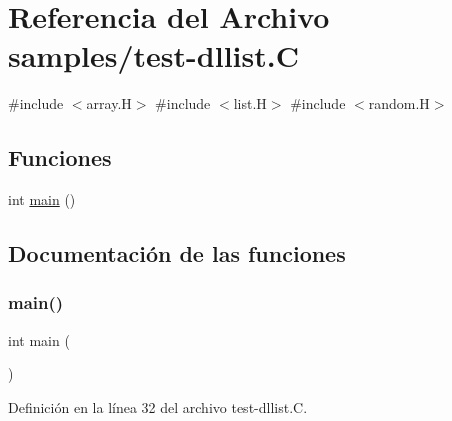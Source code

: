 \hypertarget{test-dllist_8_c}{}\section{Referencia del Archivo samples/test-\/dllist.C}
\label{test-dllist_8_c}
{\ttfamily \#include $<$array.\+H$>$}\newline
{\ttfamily \#include $<$list.\+H$>$}\newline
{\ttfamily \#include $<$random.\+H$>$}\newline
\subsection*{Funciones}
\begin{DoxyCompactItemize}
\item 
int \hyperlink{test-dllist_8_c_ae66f6b31b5ad750f1fe042a706a4e3d4}{main} ()
\end{DoxyCompactItemize}


\subsection{Documentación de las funciones}
\mbox{\label{test-dllist_8_c_ae66f6b31b5ad750f1fe042a706a4e3d4}} 
\subsubsection{\texorpdfstring{main()}{main()}}
{\footnotesize\ttfamily int main (\begin{DoxyParamCaption}{ }\end{DoxyParamCaption})}



Definición en la línea 32 del archivo test-\/dllist.\+C.

